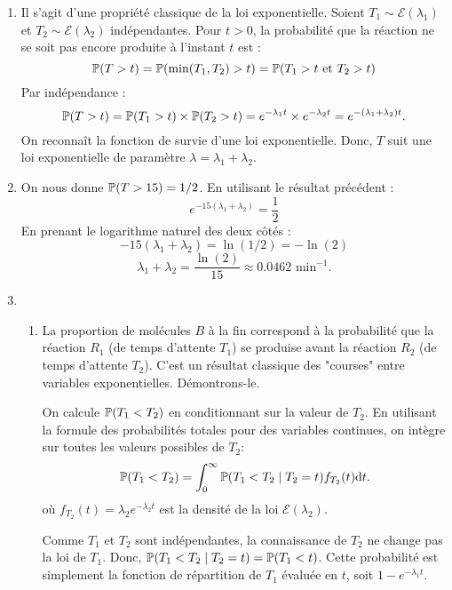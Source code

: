\documentclass[]{exercices}
\begin{document}
\begin{solution}
\begin{enumerate}
    \item Il s'agit d'une propriété classique de la loi exponentielle. Soient $T_1 \sim \mathcal{E}(\lambda_1)$ et $T_2 \sim \mathcal{E}(\lambda_2)$ indépendantes. Pour $t > 0$, la probabilité que la réaction ne se soit pas encore produite à l'instant $t$ est :
    \[ \P(T > t) = \P(\min(T_1, T_2) > t) = \P(T_1 > t \text{ et } T_2 > t) \]
    Par indépendance :
    \[ \P(T > t) = \P(T_1 > t) \times \P(T_2 > t) = e^{-\lambda_1 t} \times e^{-\lambda_2 t} = e^{-(\lambda_1 + \lambda_2)t}. \]
    On reconnaît la fonction de survie d'une loi exponentielle. Donc, $T$ suit une loi exponentielle de paramètre $\lambda = \lambda_1 + \lambda_2$.
    \item On nous donne $\P(T > 15) = 1/2$. En utilisant le résultat précédent :
    \[ e^{-15(\lambda_1 + \lambda_2)} = \frac{1}{2} \]
    En prenant le logarithme naturel des deux côtés :
    \[ -15(\lambda_1 + \lambda_2) = \ln(1/2) = -\ln(2) \]
    \[ \lambda_1 + \lambda_2 = \frac{\ln(2)}{15} \approx 0.0462 \text{ min}^{-1}. \]
    \item \begin{enumerate}
    \item La proportion de molécules $B$ à la fin correspond à la probabilité que la réaction $R_1$ (de temps d'attente $T_1$) se produise avant la réaction $R_2$ (de temps d'attente $T_2$). C'est un résultat classique des "courses" entre variables exponentielles. Démontrons-le.

    On calcule $\P(T_1 < T_2)$ en conditionnant sur la valeur de $T_2$. En utilisant la formule des probabilités totales pour des variables continues, on intègre sur toutes les valeurs possibles de $T_2$:
    \[ \P(T_1 < T_2) = \int_0^\infty \P(T_1 < T_2 \mid T_2=t) f_{T_2}(t) \dd t. \]
    où $f_{T_2}(t) = \lambda_2 e^{-\lambda_2 t}$ est la densité de la loi $\mathcal{E}(\lambda_2)$.

    Comme $T_1$ et $T_2$ sont indépendantes, la connaissance de $T_2$ ne change pas la loi de $T_1$. Donc, $\P(T_1 < T_2 \mid T_2=t) = \P(T_1 < t)$. Cette probabilité est simplement la fonction de répartition de $T_1$ évaluée en $t$, soit $1 - e^{-\lambda_1 t}$.


\end{enumerate}
\end{enumerate}
\end{solution}
\end{document}
